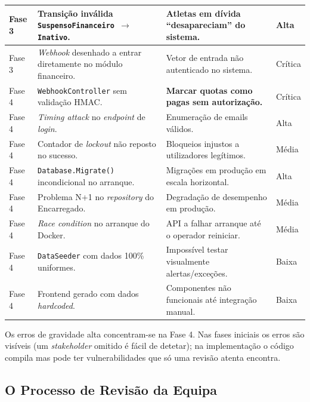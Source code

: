 \begin{center}
{\begin{xltabular}{\textwidth}{|>{\raggedright\arraybackslash}p{1.6cm}|>{\raggedright\arraybackslash}p{3.5cm}|>{\raggedright\arraybackslash}X|>{\raggedright\arraybackslash}p{2cm}|}
Fase 3 & Transição inválida \texttt{SuspensoFinanceiro $\rightarrow$ Inativo}. & Atletas em dívida ``desapareciam'' do sistema. & Alta \\ \hline

Fase 3 & \textit{Webhook} desenhado a entrar diretamente no módulo financeiro. & Vetor de entrada não autenticado no sistema. & Crítica \\ \hline

Fase 4 & \texttt{WebhookController} sem validação HMAC. & \textbf{Marcar quotas como pagas sem autorização.} & Crítica \\ \hline

Fase 4 & \textit{Timing attack} no \textit{endpoint} de \textit{login}. & Enumeração de emails válidos. & Alta \\ \hline

Fase 4 & Contador de \textit{lockout} não reposto no sucesso. & Bloqueios injustos a utilizadores legítimos. & Média \\ \hline

Fase 4 & \texttt{Database.Migrate()} incondicional no arranque. & Migrações em produção em escala horizontal. & Alta \\ \hline

Fase 4 & Problema N+1 no \textit{repository} do Encarregado. & Degradação de desempenho em produção. & Média \\ \hline

Fase 4 & \textit{Race condition} no arranque do Docker. & API a falhar arranque até o operador reiniciar. & Média \\ \hline

Fase 4 & \texttt{DataSeeder} com dados 100\% uniformes. & Impossível testar visualmente alertas/exceções. & Baixa \\ \hline

Fase 4 & Frontend gerado com dados \textit{hardcoded}. & Componentes não funcionais até integração manual. & Baixa \\ \hline

\end{xltabular}
}
\end{center}

Os erros de gravidade alta concentram-se na Fase 4. Nas fases iniciais os erros são visíveis (um \textit{stakeholder} omitido é fácil de detetar); na implementação o código compila mas pode ter vulnerabilidades que só uma revisão atenta encontra.

\subsection{O Processo de Revisão da Equipa}\label{subsec:ia_val_processo}

